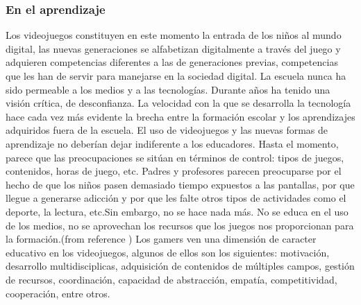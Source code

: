 \documentclass{bmcart}
\begin{document}
\subsubsection*{En el aprendizaje}
Los videojuegos constituyen en este momento la entrada de los niños al mundo digital, las nuevas generaciones se alfabetizan digitalmente a través del juego y adquieren competencias diferentes a las de generaciones previas, competencias que les han de servir para manejarse en la sociedad digital.
\newline
\newline
La escuela nunca ha sido permeable a los medios y a las tecnologías.
Durante años ha tenido una visión crítica, de desconfianza. La velocidad con la que se desarrolla la tecnología hace cada vez más evidente la brecha entre la formación escolar y los aprendizajes adquiridos fuera de la escuela.
\newline
\newline
El uso de videojuegos y las nuevas formas de aprendizaje no deberían dejar indiferente a los educadores. Hasta el momento, parece que las preocupaciones se sitúan en términos de control: tipos de juegos, contenidos, horas de juego, etc. Padres y profesores parecen preocuparse por el hecho de que los niños pasen demasiado tiempo expuestos a las pantallas, por que llegue a generarse adicción y por que les falte otros tipos de actividades como el deporte, la lectura, etc.Sin embargo, no se hace nada más. No se educa en el uso de los medios, no se aprovechan los recursos que los juegos nos proporcionan para la formación.(from reference \cite{salvat2008videojuegos})
\newline
\newline
Los gamers ven una dimensión de caracter educativo en los videojuegos, algunos de ellos son los siguientes: motivación, desarrollo multidisciplicas, adquisición de contenidos de múltiples campos, gestión de recursos, coordinación, capacidad de abstracción, empatía, competitividad, cooperación, entre otros. \cite{dominguez2012que}
\end{document}
